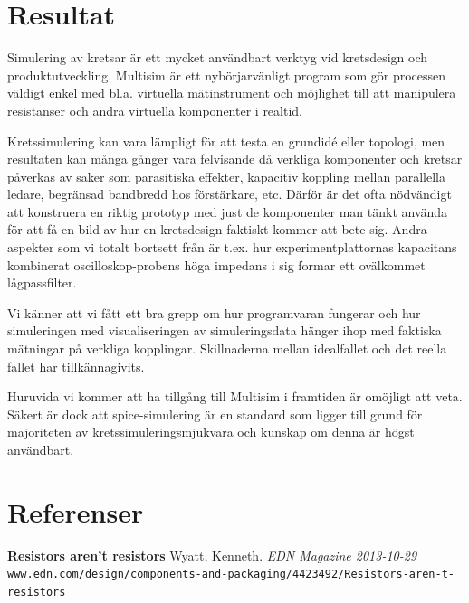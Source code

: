\documentclass[11pt,a4paper]{article}
\begin{document}
\section{Resultat}\label{setup}
Simulering av kretsar är ett mycket användbart verktyg vid kretsdesign och
produktutveckling. Multisim är ett nybörjarvänligt program som gör processen
väldigt enkel med bl.a. virtuella mätinstrument och möjlighet till att
manipulera resistanser och andra virtuella komponenter i realtid.
\par Kretssimulering kan vara lämpligt för att testa en grundidé eller topologi,
men resultaten kan många gånger vara felvisande då verkliga komponenter och
kretsar påverkas av saker som parasitiska effekter, kapacitiv koppling mellan
parallella ledare, begränsad bandbredd hos förstärkare, etc.  Därför är det
ofta nödvändigt att konstruera en riktig prototyp med just de komponenter man
tänkt använda för att få en bild av hur en kretsdesign faktiskt kommer att bete
sig.  Andra aspekter som vi totalt bortsett från är t.ex. hur
experimentplattornas kapacitans kombinerat oscilloskop-probens höga impedans i
sig formar ett ovälkommet lågpassfilter.
\par Vi känner att vi fått ett bra grepp om hur programvaran fungerar och hur
simuleringen med visualiseringen av simuleringsdata hänger ihop med faktiska
mätningar på verkliga kopplingar. Skillnaderna mellan idealfallet och det reella
fallet har tillkännagivits.
\par Huruvida vi kommer att ha tillgång till Multisim i framtiden är omöjligt
att veta. Säkert är dock att spice-simulering är en standard som ligger till
grund för majoriteten av kretssimuleringsmjukvara och kunskap om denna är högst
användbart.

\newpage

\section{Referenser}\label{refs}

\textbf{Resistors aren't resistors} Wyatt, Kenneth. \textit{EDN Magazine 2013-10-29}
\texttt{www.edn.com/design/components-and-packaging/4423492/Resistors-aren-t-resistors}






\end{document}
